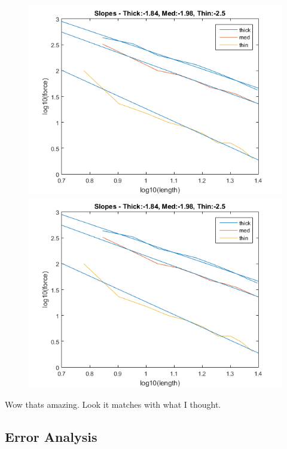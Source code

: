 \documentclass{article}
\begin{document}
\begin{figure}[h]
	\begin{minipage}{.5\textwidth}
		\centering
		\includegraphics[scale=.3]{Lab1f1.png}
	\end{minipage}		
	\begin{minipage}{.5\textwidth}
		\centering
		\includegraphics[scale=.3]{Lab1f1.png}
	\end{minipage}
\end{figure}

Wow thats amazing. Look it matches with what I thought.

\subsection{Error Analysis}
\end{document}
